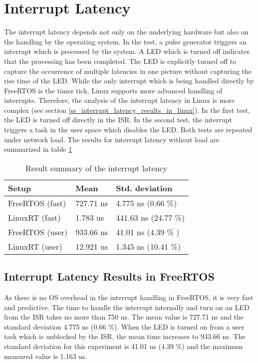 \section{Interrupt Latency}\label{s_interrup_latency} 
The interrupt latency depends not only on the underlying hardware but also on the handling by the operating system.
In the test, a pulse generator triggers an interrupt which is processed by the system.
A \ac{LED} which is turned off indicates that the processing has been completed. 
The \ac{LED} is explicitly turned off to capture the occurrence of multiple latencies in one picture without capturing the rise time of the \ac{LED}.
While the only interrupt which is being handled directly by FreeRTOS is the timer tick, Linux supports more advanced handling of interrupts.
Therefore, the analysis of the interrupt latency in Linux is more complex (see section \ref{ss_interrupt_latency_results_in_linux}). 
In the first test, the \ac{LED} is turned off directly in the \ac{ISR}.
In the second test, the interrupt triggers a task in the user space which disables the \ac{LED}. 
Both tests are repeated under network load.
The results for interrupt latency without load are summarized in table \ref{tab_summary_interrupts}

\begin{table}[htb]
	\centering
		\begin{tabular}{|l||l|l|}
			\hline
			Setup & Mean  & Std. deviation \\
			\hline
			  FreeRTOS (fast)	&  727.71 ns	& 4.775 ns (0.66 \%) \\
			  \hline
			  LinuxRT (fast) 	&  1.783 us & 441.63 ns (24.77 \%) \\
			  \hline
			  FreeRTOS (user)	& 933.66 ns & 41.01 ns (4.39 \% ) \\
			  \hline
			  LinuxRT (user)	& 12.921 us	& 1.345 ns (10.41 \%)\\
			  \hline
		\end{tabular}
	\caption{Result summary of the interrupt latency}
	\label{tab_summary_interrupts}
\end{table}

\subsection{Interrupt Latency Results in FreeRTOS}
As there is no \ac{OS} overhead in the interrupt handling in FreeRTOS, it is very fast and predictive.
The time to handle the interrupt internally and turn on an \ac{LED} from the \ac{ISR} takes no more than 750 ns. 
The mean value is 727.71 ns and the standard deviation 4.775 ns (0.66 \%). 
When the \ac{LED} is turned on from a user task which is unblocked by the \ac{ISR}, the mean time increases to 933.66 ns.
The standard deviation for this experiment is 41.01 ns (4.39 \%) and the maximum measured value is 1.163 us.
  

